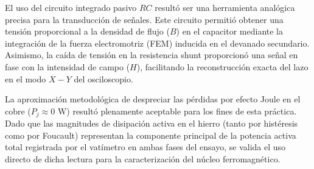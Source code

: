 El uso del circuito integrado pasivo $RC$ resultó ser una herramienta analógica precisa para la transducción de señales. Este circuito permitió obtener una tensión proporcional a la densidad de flujo ($B$) en el capacitor mediante la integración de la fuerza electromotriz (FEM) inducida en el devanado secundario. Asimismo, la caída de tensión en la resistencia shunt proporcionó una señal en fase con la intensidad de campo ($H$), facilitando la reconstrucción exacta del lazo en el modo $X-Y$ del osciloscopio.
    
La aproximación metodológica de despreciar las pérdidas por efecto Joule en el cobre ($P_j \approx 0\text{ W}$) resultó plenamente aceptable para los fines de esta práctica. Dado que las magnitudes de disipación activa en el hierro (tanto por histéresis como por Foucault) representan la componente principal de la potencia activa total registrada por el vatímetro en ambas fases del ensayo, se valida el uso directo de dicha lectura para la caracterización del núcleo ferromagnético.
